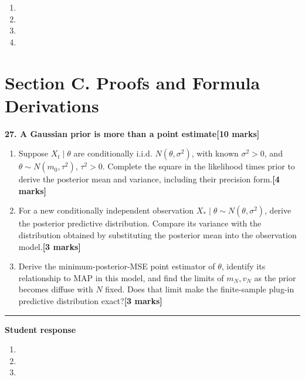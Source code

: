 \documentclass[11pt,a4paper]{article}
\newlength{\BlankAnswerHeight}\setlength{\BlankAnswerHeight}{16mm}
\newcommand{\AnswerBlank}{\leavevmode\par\vspace{\BlankAnswerHeight}}
\begin{document}
\begin{enumerate}[label=(\alph*),leftmargin=8mm,itemsep=3pt]
\item
\AnswerBlank
\item
\AnswerBlank
\item
\AnswerBlank
\item
\AnswerBlank
\end{enumerate}
\newpage\section*{Section C. Proofs and Formula Derivations}
\textbf{27. A Gaussian prior is more than a point estimate}\hfill\textbf{[10 marks]}\par\medskip
\begin{enumerate}[label=(\alph*),leftmargin=8mm,itemsep=3pt]
\item Suppose \(X_t\mid\theta\) are conditionally i.i.d. \(N(\theta,\sigma^2)\), with known \(\sigma^2>0\), and \(\theta\sim N(m_0,\tau^2)\), \(\tau^2>0\). Complete the square in the likelihood times prior to derive the posterior mean and variance, including their precision form.\hfill\textbf{[4 marks]}
\item For a new conditionally independent observation \(X_*\mid\theta\sim N(\theta,\sigma^2)\), derive the posterior predictive distribution. Compare its variance with the distribution obtained by substituting the posterior mean into the observation model.\hfill\textbf{[3 marks]}
\item Derive the minimum-posterior-MSE point estimator of \(\theta\), identify its relationship to MAP in this model, and find the limits of \(m_N,v_N\) as the prior becomes diffuse with \(N\) fixed. Does that limit make the finite-sample plug-in predictive distribution exact?\hfill\textbf{[3 marks]}
\end{enumerate}\par\medskip\hrule\medskip\textbf{Student response}\par
\begin{enumerate}[label=(\alph*),leftmargin=8mm,itemsep=3pt]
\item
\AnswerBlank
\item
\AnswerBlank
\item
\AnswerBlank
\end{enumerate}
\end{document}
